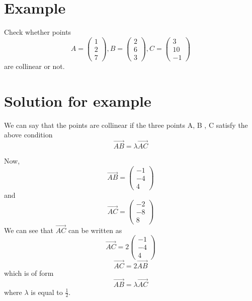 \documentclass[journal,12pt,twocolumn]{IEEEtran}
\begin{document}
\section{Example}
Check whether points
\[
    A =
    \begin{pmatrix}
        1 \\
        2 \\
        7
    \end{pmatrix},
    B =
    \begin{pmatrix}
        2 \\
        6 \\
        3
    \end{pmatrix},
    C =
    \begin{pmatrix}
        3  \\
        10 \\
        -1
    \end{pmatrix}
\]
are collinear or not.

\section{Solution for example}
We can say that the points are collinear if the three points A, B
, C satisfy the above condition
\begin{equation}
    \overrightarrow{AB} = \lambda\overrightarrow{AC}
\end{equation}

Now,
\begin{equation}
    \overrightarrow{AB} =
    \begin{pmatrix}
        -1 \\
        -4 \\
        4
    \end{pmatrix}
\end{equation}
and
\begin{equation}
    \overrightarrow{AC} =
    \begin{pmatrix}
        -2 \\
        -8 \\
        8
    \end{pmatrix}
\end{equation}
We can see that $\overrightarrow{AC}$ can be written as
\begin{equation}
    \overrightarrow{AC} =2
    \begin{pmatrix}
        -1 \\
        -4 \\
        4
    \end{pmatrix}
\end{equation}
\begin{equation}
    \overrightarrow{AC} = 2\overrightarrow{AB}
\end{equation}
which is of form
\begin{equation}
    \overrightarrow{AB} = \lambda\overrightarrow{AC}
\end{equation}
where $\lambda$ is equal to $\frac{1}{2}$.
\end{document}
